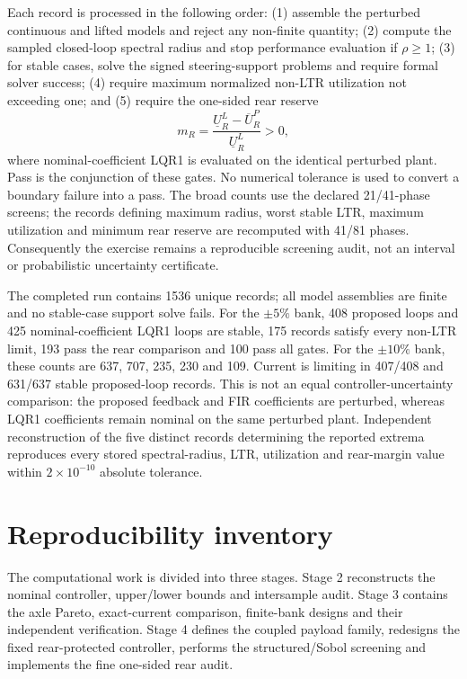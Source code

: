 \documentclass[10pt,a4paper]{article}
\newcommand{\robustnew}[1]{#1}
\begin{document}
\robustnew{Each record is processed in the following order: (1) assemble the perturbed continuous and lifted models and reject any non-finite quantity; (2) compute the sampled closed-loop spectral radius and stop performance evaluation if $\rho\ge1$; (3) for stable cases, solve the signed steering-support problems and require formal solver success; (4) require maximum normalized non-LTR utilization not exceeding one; and (5) require the one-sided rear reserve
\[
m_R=\frac{\underline U_R^{L}-\overline U_R^{P}}{\underline U_R^{L}}>0,
\]
where nominal-coefficient LQR1 is evaluated on the identical perturbed plant. Pass is the conjunction of these gates. No numerical tolerance is used to convert a boundary failure into a pass. The broad counts use the declared 21/41-phase screens; the records defining maximum radius, worst stable LTR, maximum utilization and minimum rear reserve are recomputed with 41/81 phases. Consequently the exercise remains a reproducible screening audit, not an interval or probabilistic uncertainty certificate.}

\robustnew{The completed run contains 1536 unique records; all model assemblies are finite and no stable-case support solve fails. For the $\pm5\%$ bank, 408 proposed loops and 425 nominal-coefficient LQR1 loops are stable, 175 records satisfy every non-LTR limit, 193 pass the rear comparison and 100 pass all gates. For the $\pm10\%$ bank, these counts are 637, 707, 235, 230 and 109. Current is limiting in 407/408 and 631/637 stable proposed-loop records. This is not an equal controller-uncertainty comparison: the proposed feedback and FIR coefficients are perturbed, whereas LQR1 coefficients remain nominal on the same perturbed plant. Independent reconstruction of the five distinct records determining the reported extrema reproduces every stored spectral-radius, LTR, utilization and rear-margin value within $2\times10^{-10}$ absolute tolerance.}

\section{Reproducibility inventory}

The computational work is divided into three stages. Stage 2 reconstructs the nominal controller, upper/lower bounds and intersample audit. Stage 3 contains the axle Pareto, exact-current comparison, finite-bank designs and their independent verification. Stage 4 defines the coupled payload family, redesigns the fixed rear-protected controller, performs the structured/Sobol screening and implements the fine one-sided rear audit.
\end{document}
